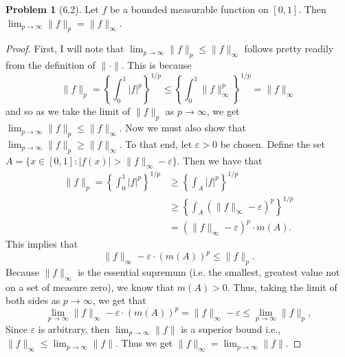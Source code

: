 \documentclass[12pt]{article}
\renewcommand{\epsilon}{\varepsilon}
\theoremstyle{definition}
\newtheorem{problem}{Problem}
\begin{document}
\begin{problem}[6.2]
    Let \( f \) be a bounded measurable function on \( [0, 1] \). Then
    \( \displaystyle \lim_{p \to \infty} \lVert f \rVert_{p} = \lVert f \rVert_{\infty} \).

        \begin{proof}
            First, I will note that \(\displaystyle \lim_{p \to \infty} \lVert f \rVert_{p} \leq \lVert f \rVert_{\infty}  \) follows pretty readily from the definition of \( \lVert \cdot \rVert \). This is because
                \[
                \lVert f \rVert_{p} = \left\{ \int_{0}^{1} |f|^p \right\}^{1/p}  \leq  \left\{ \int_{0}^{1} \lVert f \rVert^p_{\infty} \right\}^{1/p} = \lVert f \rVert_{\infty}
                \]
            and so as we take the limit of \( \lVert f \rVert_{p} \) as \( p \to \infty \), we get \(\displaystyle \lim_{p \to \infty} \lVert f \rVert_{p} \leq \lVert f \rVert_{\infty}  \).
            Now we must also show that \(\displaystyle \lim_{p \to \infty} \lVert f \rVert_{p} \geq \lVert f \rVert_{\infty}  \).
            To that end, let \( \epsilon > 0 \) be chosen. Define the set \( A = \{ x \in [0,1]: |f(x)| > \lVert f \rVert_{\infty} - \epsilon \} \).  
            Then we have that 
                \begin{align*}
                    \lVert f \rVert_{p} = \left\{ \int_{0}^{1} |f|^p \right\}^{1/p} &\geq \left\{ \int_{A} |f|^p \right\}^{1/p} \\
                     &\geq  \left\{ \int_{A} (\lVert f \rVert_{\infty} - \epsilon)^{p} \right\}^{1/p} \\ 
                     &= (\lVert f \rVert_{\infty} - \epsilon)^{p} \cdot m(A).
                \end{align*}
            This implies that 
                \[
                    \lVert f \rVert_{\infty} - \epsilon \cdot (m(A))^{p} \leq \lVert f \rVert_{p}.
                \]
            Because \( \lVert f \rVert_{\infty} \) is the essential supremum (i.e. the smallest, greatest value not on a set of measure zero), we know that \( m(A) >  0 \). 
            Thus, taking the limit of both sides as \( p \to \infty \), we get that 
                \[
                  \lim_{p \to \infty} \lVert f \rVert_{\infty} - \epsilon \cdot (m(A))^{p} = \lVert f \rVert_{\infty} - \epsilon \leq \lim_{p \to \infty} \lVert f \rVert_{p},
                \]
            Since \( \epsilon \) is arbitrary, then \( \displaystyle \lim_{p \to \infty} \lVert f \rVert \) is a superior bound i.e., \( \displaystyle \lVert f \rVert_{\infty} \leq \lim_{p \to \infty} \lVert f \rVert  \). Thus we get \( \displaystyle \lVert f \rVert_{\infty} = \lim_{p \to \infty} \lVert f \rVert\).
        \end{proof}
\end{problem}
\end{document}
